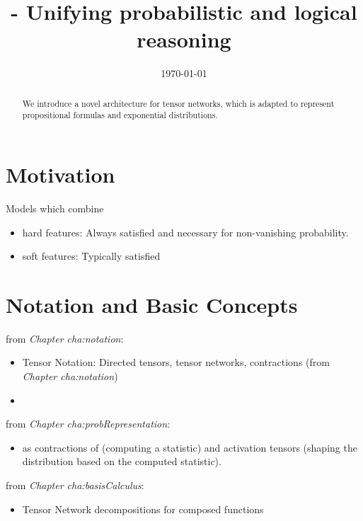 \documentclass[aps,onecolumn,nofootinbib,pra]{article}
\renewcommand{\charef}[1]{\textit{Chapter #1}}
\begin{document}
    \title{\ComputationActivationNetworks{} - Unifying probabilistic and logical reasoning}

    \maketitle
    \date{\today}

    \begin{abstract}
        We introduce a novel architecture for tensor networks, which is adapted to represent propositional formulas and exponential distributions.
    \end{abstract}


    \section{Motivation}


    Models which combine
    \begin{itemize}
        \item hard features: Always satisfied and necessary for non-vanishing probability.
        \item soft features: Typically satisfied
    \end{itemize}


    \section{Notation and Basic Concepts}

    from \charef{cha:notation}:
    \begin{itemize}
        \item Tensor Notation: Directed tensors, tensor networks, contractions (from \charef{cha:notation})
        \item \BasisEncodings{}
    \end{itemize}

    from \charef{cha:probRepresentation}:
    \begin{itemize}
        \item \ComputationActivationNetworks{} as contractions of \BasisEncodings{} (computing a statistic) and activation tensors (shaping the distribution based on the computed statistic).
    \end{itemize}

    from \charef{cha:basisCalculus}:
    \begin{itemize}
        \item Tensor Network decompositions for composed functions
    \end{itemize}
\end{document}
